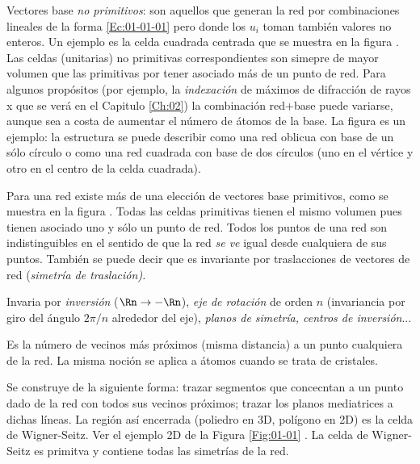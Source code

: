\begin{definition}
    Vectores base {\it no primitivos}: son aquellos que generan la red por combinaciones lineales de la forma \ref{Ec:01-01-01} pero donde los $u_i$ toman también valores no enteros. Un ejemplo es la celda cuadrada centrada que se muestra en la figura . Las celdas (unitarias) no primitivas correspondientes son simepre de mayor volumen que las primitivas por tener asociado más de un punto de red. Para algunos propósitos (por ejemplo, la {\it indexación} de máximos de difracción de rayos x que se verá en el Capitulo \ref{Ch:02}) la combinación red+base puede variarse, aunque sea a costa de aumentar el número de átomos de la base. La figura es un ejemplo: la estructura se puede describir como una red oblicua con base de un sólo círculo o como una red cuadrada con base de dos círculos (uno en el vértice y otro en el centro de la celda cuadrada).
\end{definition}

\begin{definition}
    Para una red existe más de una elección de vectores base primitivos, como se muestra en la figura . Todas las celdas primitivas tienen el mismo volumen pues tienen asociado uno y sólo un punto de red. Todos los puntos de una red son indistinguibles en el sentido de que la red {\it se ve} igual desde cualquiera de sus puntos. También se puede decir que es invariante por traslacciones de vectores de red (\it{simetría de traslación}).          
\end{definition}

\begin{definition}
    Invaria por {\it inversión} ($\Rn \rightarrow - \Rn$), {\it eje de rotación} de orden $n$ (invariancia por giro del ángulo $2\pi/n$ alrededor del eje), {\it planos de simetría, centros de inversión}...    
\end{definition}

\begin{definition}
    Es la número de vecinos más próximos (misma distancia) a un punto cualquiera de la red. La misma noción se aplica a átomos cuando se trata de cristales.
\end{definition}

\begin{definition}
    Se construye de la siguiente forma: trazar segmentos que concecntan a un punto dado de la red con todos sus vecinos próximos; trazar los planos mediatrices a dichas líneas. La región así encerrada (poliedro en 3D, polígono en 2D) es la celda de Wigner-Seitz. Ver el ejemplo 2D de la Figura \ref{Fig:01-01} . La celda de Wigner-Seitz es primitva y contiene todas las simetrías de la red.    
\end{definition}

